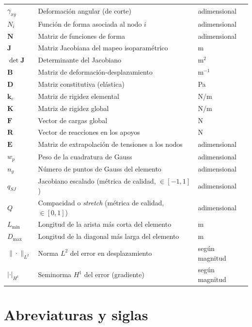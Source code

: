 \begin{longtable}{@{}p{2.4cm}p{8.4cm}p{3.0cm}@{}}
$\gamma_{xy}$ & Deformación angular (de corte) & adimensional \\
$N_i$ & Función de forma asociada al nodo $i$ & adimensional \\
$\bm{N}$ & Matriz de funciones de forma & adimensional \\
$\bm{J}$ & Matriz Jacobiana del mapeo isoparamétrico & m \\
$\det\bm{J}$ & Determinante del Jacobiano & m$^2$ \\
$\bm{B}$ & Matriz de deformación-desplazamiento & m$^{-1}$ \\
$\bm{D}$ & Matriz constitutiva (elástica) & Pa \\
$\bm{k}_e$ & Matriz de rigidez elemental & N/m \\
$\bm{K}$ & Matriz de rigidez global & N/m \\
$\bm{F}$ & Vector de cargas global & N \\
$\bm{R}$ & Vector de reacciones en los apoyos & N \\
$\bm{E}$ & Matriz de extrapolación de tensiones a los nodos & adimensional \\
$w_p$ & Peso de la cuadratura de Gauss & adimensional \\
$n_g$ & Número de puntos de Gauss del elemento & adimensional \\
$q_{SJ}$ & Jacobiano escalado (métrica de calidad, $\in[-1,1]$) & adimensional \\
$Q$ & Compacidad o \emph{stretch} (métrica de calidad, $\in[0,1]$) & adimensional \\
$L_{\min}$ & Longitud de la arista más corta del elemento & m \\
$D_{\max}$ & Longitud de la diagonal más larga del elemento & m \\
$\|\cdot\|_{L^2}$ & Norma $L^2$ del error en desplazamiento & según magnitud \\
$|\cdot|_{H^1}$ & Seminorma $H^1$ del error (gradiente) & según magnitud \\
\end{longtable}

\section*{Abreviaturas y siglas}

